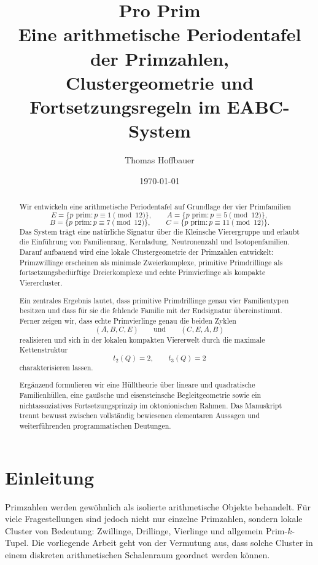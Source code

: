 \documentclass[12pt,a4paper]{article}
\title{\textbf{Pro Prim}\\[1ex]
	\large Eine arithmetische Periodentafel der Primzahlen,\\
	Clustergeometrie und Fortsetzungsregeln im EABC-System}
\author{Thomas Hoffbauer}
\date{\today}
\theoremstyle{definition}
\theoremstyle{remark}
\begin{document}
	\maketitle
	
	\begin{abstract}
		Wir entwickeln eine arithmetische Periodentafel auf Grundlage der vier Primfamilien
		\[
		E=\{p\text{ prim}:p\equiv 1\pmod{12}\},\qquad
		A=\{p\text{ prim}:p\equiv 5\pmod{12}\},
		\]
		\[
		B=\{p\text{ prim}:p\equiv 7\pmod{12}\},\qquad
		C=\{p\text{ prim}:p\equiv 11\pmod{12}\}.
		\]
		Das System trägt eine natürliche Signatur über die Kleinsche Vierergruppe und erlaubt die Einführung von Familienrang, Kernladung, Neutronenzahl und Isotopenfamilien. Darauf aufbauend wird eine lokale Clustergeometrie der Primzahlen entwickelt: Primzwillinge erscheinen als minimale Zweierkomplexe, primitive Primdrillinge als fortsetzungsbedürftige Dreierkomplexe und echte Primvierlinge als kompakte Vierercluster.
		
		Ein zentrales Ergebnis lautet, dass primitive Primdrillinge genau vier Familientypen besitzen und dass für sie die fehlende Familie mit der Endsignatur übereinstimmt. Ferner zeigen wir, dass echte Primvierlinge genau die beiden Zyklen
		\[
		(A,B,C,E)\qquad\text{und}\qquad(C,E,A,B)
		\]
		realisieren und sich in der lokalen kompakten Viererwelt durch die maximale Kettenstruktur
		\[
		t_2(Q)=2,\qquad t_3(Q)=2
		\]
		charakterisieren lassen.
		
		Ergänzend formulieren wir eine Hülltheorie über lineare und quadratische Familienhüllen, eine gaußsche und eisensteinsche Begleitgeometrie sowie ein nichtassoziatives Fortsetzungsprinzip im oktonionischen Rahmen. Das Manuskript trennt bewusst zwischen vollständig bewiesenen elementaren Aussagen und weiterführenden programmatischen Deutungen.
	\end{abstract}
	
	\tableofcontents
	
	\section{Einleitung}
	
	Primzahlen werden gewöhnlich als isolierte arithmetische Objekte behandelt. Für viele Fragestellungen sind jedoch nicht nur einzelne Primzahlen, sondern lokale Cluster von Bedeutung: Zwillinge, Drillinge, Vierlinge und allgemein Prim-\(k\)-Tupel. Die vorliegende Arbeit geht von der Vermutung aus, dass solche Cluster in einem diskreten arithmetischen Schalenraum geordnet werden können.
	
\end{document}
